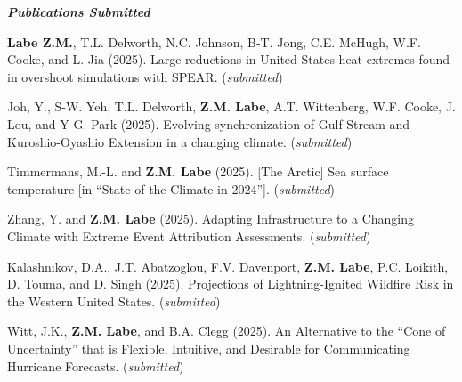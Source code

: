 \documentclass[margin,line,palatino,courier,10pt]{res}
\begin{document}
\begin{resume}
\textit{\textbf{Publications Submitted}}
\vspace*{-0.1in}\\
\begin{etaremune}[leftmargin=0in,topsep=0in,parsep=0in]
\item \textbf{Labe Z.M.}, T.L. Delworth, N.C. Johnson, B-T. Jong, C.E. McHugh, W.F. Cooke, and L. Jia (2025). Large reductions in United States heat extremes found in overshoot simulations with SPEAR. (\textit{submitted})
\item Joh, Y., S-W. Yeh, T.L. Delworth, \textbf{Z.M. Labe}, A.T. Wittenberg, W.F. Cooke, J. Lou, and Y-G. Park (2025). Evolving synchronization of Gulf Stream and Kuroshio-Oyashio Extension in a changing climate. (\textit{submitted})
\item Timmermans, M.-L. and \textbf{Z.M. Labe} (2025). [The Arctic] Sea surface temperature [in “State of the Climate in 2024”]. (\textit{submitted})
\item Zhang, Y. and \textbf{Z.M. Labe} (2025). Adapting Infrastructure to a Changing Climate with Extreme Event Attribution Assessments. (\textit{submitted})
\item Kalashnikov, D.A., J.T. Abatzoglou, F.V. Davenport, \textbf{Z.M. Labe}, P.C. Loikith, D. Touma, and D. Singh (2025). Projections of Lightning-Ignited Wildfire Risk in the Western United States. (\textit{submitted})
\item Witt, J.K., \textbf{Z.M. Labe}, and B.A. Clegg (2025). An Alternative to the ``Cone of Uncertainty'' that is Flexible, Intuitive, and Desirable for Communicating Hurricane Forecasts. (\textit{submitted})
\end{etaremune}



\end{resume}
\end{document}
